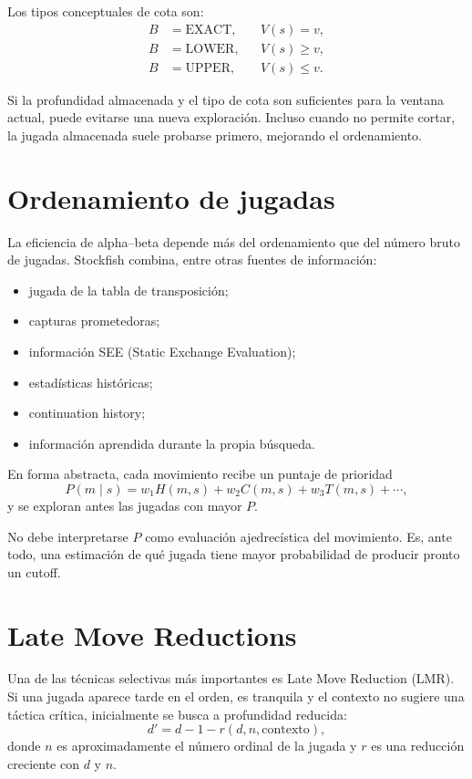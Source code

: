\documentclass[11pt,a4paper]{article}
\begin{document}
Los tipos conceptuales de cota son:
\begin{align*}
B &= \text{EXACT}, && V(s)=v,\\
B &= \text{LOWER}, && V(s)\ge v,\\
B &= \text{UPPER}, && V(s)\le v.
\end{align*}

Si la profundidad almacenada y el tipo de cota son suficientes para la ventana actual, puede evitarse una nueva exploración. Incluso cuando no permite cortar, la jugada almacenada suele probarse primero, mejorando el ordenamiento.

\section{Ordenamiento de jugadas}

La eficiencia de alpha--beta depende más del ordenamiento que del número bruto de jugadas. Stockfish combina, entre otras fuentes de información:
\begin{itemize}
    \item jugada de la tabla de transposición;
    \item capturas prometedoras;
    \item información SEE (Static Exchange Evaluation);
    \item estadísticas históricas;
    \item continuation history;
    \item información aprendida durante la propia búsqueda.
\end{itemize}

En forma abstracta, cada movimiento recibe un puntaje de prioridad
\[
P(m\mid s)=w_1 H(m,s)+w_2 C(m,s)+w_3 T(m,s)+\cdots,
\]
y se exploran antes las jugadas con mayor $P$.

No debe interpretarse $P$ como evaluación ajedrecística del movimiento. Es, ante todo, una estimación de qué jugada tiene mayor probabilidad de producir pronto un cutoff.

\section{Late Move Reductions}

Una de las técnicas selectivas más importantes es Late Move Reduction (LMR). Si una jugada aparece tarde en el orden, es tranquila y el contexto no sugiere una táctica crítica, inicialmente se busca a profundidad reducida:
\[
    d' = d-1-r(d,n,\text{contexto}),
\]
donde $n$ es aproximadamente el número ordinal de la jugada y $r$ es una reducción creciente con $d$ y $n$.
\end{document}
